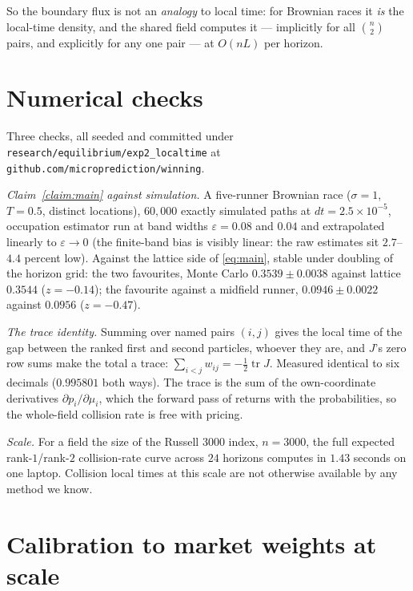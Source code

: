 \documentclass[11pt]{article}
\begin{document}
So the boundary flux is not an \emph{analogy} to local time: for
Brownian races it \emph{is} the local-time density, and the shared
field computes it --- implicitly for all $\binom{n}{2}$ pairs, and
explicitly for any one pair --- at $O(nL)$ per horizon.

\section{Numerical checks}

Three checks, all seeded and committed under
\texttt{research/equilibrium/exp2\_localtime} at
\texttt{github.com/microprediction/winning}.

\emph{Claim~\ref{claim:main} against simulation.} A five-runner
Brownian race ($\sigma=1$, $T=0.5$, distinct locations), $60{,}000$
exactly simulated paths at $dt=2.5\times10^{-5}$, occupation estimator
run at band widths $\varepsilon=0.08$ and $0.04$ and extrapolated
linearly to $\varepsilon\to0$ (the finite-band bias is visibly linear:
the raw estimates sit $2.7$--$4.4$ percent low). Against the lattice
side of \eqref{eq:main}, stable under doubling of the horizon grid:
the two favourites, Monte Carlo $0.3539\pm0.0038$ against lattice
$0.3544$ ($z=-0.14$); the favourite against a midfield runner,
$0.0946\pm0.0022$ against $0.0956$ ($z=-0.47$).

\emph{The trace identity.} Summing over named pairs $(i,j)$ gives the
local time of the gap between the ranked first and second particles,
whoever they are, and $J$'s zero row sums make the total a trace:
$\sum_{i<j} w_{ij} = -\tfrac12\operatorname{tr}J$. Measured identical
to six decimals ($0.995801$ both ways). The trace is the sum of the
own-coordinate derivatives $\partial p_i/\partial\mu_i$, which the
forward pass of \citet{cotton2026} returns with the probabilities, so
the whole-field collision rate is free with pricing.

\emph{Scale.} For a field the size of the Russell 3000 index,
$n=3000$, the full expected
rank-$1$/rank-$2$ collision-rate curve across $24$ horizons computes in
$1.43$ seconds on one laptop. Collision local times at this scale are
not otherwise available by any method we know.

\section{Calibration to market weights at scale}
\end{document}
